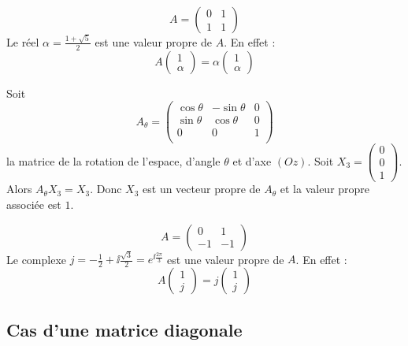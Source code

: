 \documentclass[11pt, class=report,crop=false]{standalone}
\begin{document}
\begin{exemple}
$$A = \begin{pmatrix}0 & 1\\1 &1\end{pmatrix}$$
Le réel $\alpha =\frac{1+\sqrt{5}}{2}$ est une valeur propre de $A$. En effet :
\[A\begin{pmatrix}1\\\alpha\end{pmatrix}
= \alpha \begin{pmatrix}1\\\alpha\end{pmatrix}\]
\end{exemple}



\begin{exemple}
Soit 
$$A_\theta = \begin{pmatrix}
\cos\theta & -\sin\theta & 0 \\
\sin\theta &  \cos\theta & 0 \\
0          & 0           & 1 \\
\end{pmatrix}$$
la matrice de la rotation de l'espace, d'angle $\theta$ et d'axe $(Oz)$.
Soit $X_3 = \left( \begin{smallmatrix} 0 \\ 0 \\ 1 \end{smallmatrix}\right)$.  
Alors $A_\theta X_3=X_3$. Donc $X_3$ est un vecteur propre de $A_\theta$ et la valeur propre associée est $1$.
\end{exemple}


\begin{exemple}
$$A = \begin{pmatrix}0 & 1\\-1 &-1\end{pmatrix}$$
Le complexe $j =-\frac{1}{2} + \ii \frac{\sqrt{3}}{2} = e^{\ii\frac{2\pi}{3}}$ est une valeur propre de $A$. En effet :
\[A\begin{pmatrix}1\\j\end{pmatrix} 
= j\begin{pmatrix}1\\j\end{pmatrix}\]
\end{exemple}


\subsection{Cas d'une matrice diagonale}
\end{document}
